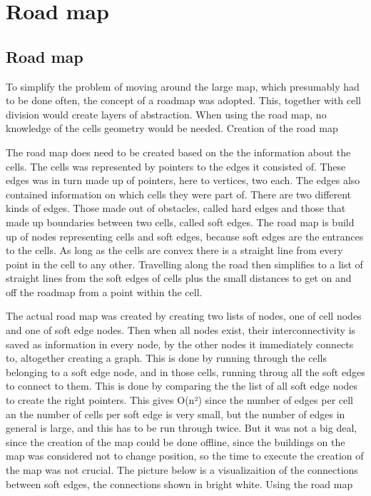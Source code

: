 \chapter{Road map}\label{chap:roadmap}

\section{ Road map }
To simplify the problem of moving around the large map, which presumably had to
be done often, the concept of a roadmap was adopted. This, together with cell
division would create  layers of abstraction. When using the road map, no
knowledge of the cells geometry would be needed.
Creation of the road map

The road map does need to be created based on the the information about the
cells. The cells was represented by pointers to the edges it consisted of. These
edges was in turn made up of pointers, here to vertices, two each. The edges
also contained information on which cells they were part of. There are two
different kinds of edges. Those made out of obstacles, called hard edges and
those that made up boundaries between two cells, called soft edges. The road map
is build up of nodes representing cells and soft edges, because soft edges are
the entrances to the cells. As long as the cells are convex there is a straight
line from every point in the cell to any other. Travelling along the road then
simplifies to a list of straight lines from the soft edges of cells plus the
small distances to get on and off the roadmap from a point within the cell.

The actual road map was created by creating two lists of nodes, one of cell
nodes and one of soft edge nodes. Then when all nodes exist, their
interconnectivity is saved as information in every node, by the other nodes it
immediately connects to, altogether creating a graph. This is done by running
through the cells belonging to a soft edge node, and in those cells, running
throug all the soft edges to connect to them. This is done by comparing the the
list of all soft edge nodes to create the right pointers. This gives O(n²) since
the number of edges per cell an the number of cells per soft edge is very small,
but the number of edges in general is large, and this has to be run through
twice. But it was not a big deal, since the creation of the map could be done
offline, since the buildings on the map was considered not to change position,
so the time to execute the creation of the map was not crucial. The picture
below is a visualizaition of the connections between soft edges, the connections
shown in bright white.
Using the road map

